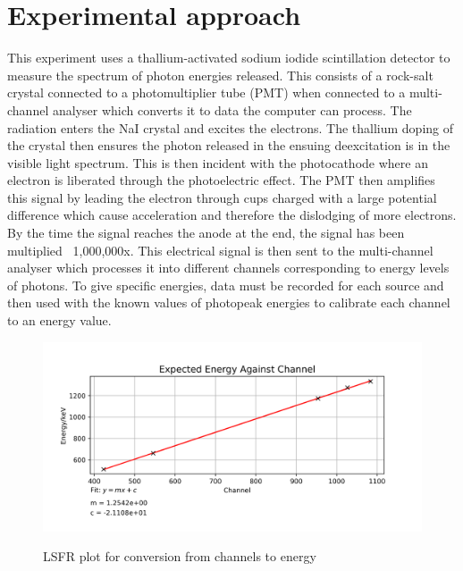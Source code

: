 \documentclass[11pt]{article} %
\newcommand{\citet}{\cite} %
\begin{document}



\section{Experimental approach}
    This experiment uses a thallium-activated sodium iodide scintillation detector to measure the spectrum of photon energies released. This consists of a rock-salt crystal connected to a photomultiplier tube (PMT) when connected to a multi-channel analyser which converts it to data the computer can process. 
    The radiation enters the NaI crystal and excites the electrons. The thallium doping of the crystal then ensures the photon released in the ensuing deexcitation is in the visible light spectrum. This is then incident with the photocathode where an electron is liberated through the photoelectric effect. The PMT then amplifies this signal by leading the electron through cups charged with a large potential difference which cause acceleration and therefore the dislodging of more electrons. By the time the signal reaches the anode at the end, the signal has been multiplied ~1,000,000x.
    This electrical signal is then sent to the multi-channel analyser which processes it into different channels corresponding to energy levels of photons. To give specific energies, data must be recorded for each source and then used with the known values of photopeak energies \cite{Decay} to calibrate each channel to an energy value.

    \begin{figure}[H] \centering \label{calibration}
        \includegraphics[scale=0.5]{assets/Calibration.png}
        \caption{LSFR plot for conversion from channels to energy}
    \end{figure}
\end{document}
